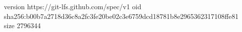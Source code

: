 version https://git-lfs.github.com/spec/v1
oid sha256:b00b7a2718d36c8a2fc3fe20be02c3e6759dcd18781b8e2965362317108ffe81
size 2796344
